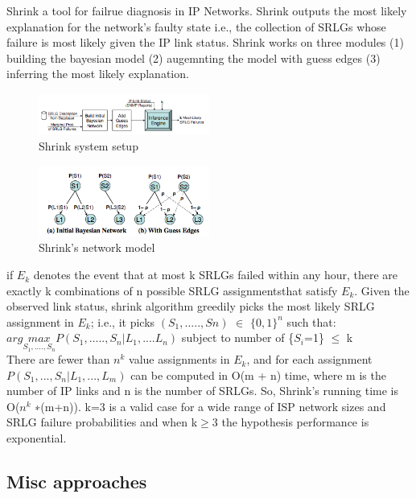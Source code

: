 \documentclass[10pt]{sigplan-proc-varsize}
\begin{document}
\cite{Kandula:05} Shrink a tool for failrue diagnosis in IP Networks. Shrink outputs the most likely explanation for the network's faulty state i.e., the collection of SRLGs whose failure is most likely given the IP link status. Shrink works on three modules (1) building the bayesian model (2) augemnting the model with guess edges (3) inferring the most likely explanation.

\begin{figure}[h!]
  \caption{Shrink system setup}
  \centering
    \includegraphics[width=0.5\textwidth]{Fig8}
\end{figure}

\begin{figure}[h!]
  \caption{Shrink's network model}
  \centering
    \includegraphics[width=0.5\textwidth]{Fig9}
\end{figure}

if $E_k$ denotes the event that at most k SRLGs failed within any hour, there are exactly k combinations of n possible SRLG assignmentsthat satisfy $E_k$. Given the observed link status, shrink algorithm greedily picks the most likely SRLG assignment in $E_k$; i.e., it picks $(S_1,.....,Sn)$ $\in$ $\{0,1\}^n$ such that: \\
$arg \underset{S_1,....,S_n}{max} P(S_1,.....,S_n|L_1,....L_n)$ subject to number of \{$S_i$=1\} $\leq$ k \\
There are fewer than $n^k$ value assignments in $E_k$, and for each assignment $P(S_1,...,S_n|L_1,...,L_m)$ can be computed in O(m + n) time, where m is the number of IP links and n is the number of SRLGs. So, Shrink’s running time is O($n^k$ ∗(m+n)). k=3 is a valid case for a wide range of ISP network sizes and SRLG failure probabilities and when k$\geq$3 the hypothesis performance is exponential. 

\subsection{Misc approaches}
\end{document}
